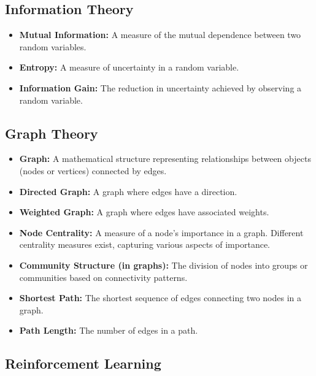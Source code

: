\documentclass[12pt, a4paper]{article}
\begin{document}
\subsection{Information Theory}

\begin{itemize}
    \item \textbf{Mutual Information:}  A measure of the mutual dependence between two random variables.
    \item \textbf{Entropy:} A measure of uncertainty in a random variable.
    \item \textbf{Information Gain:}  The reduction in uncertainty achieved by observing a random variable.
\end{itemize}


\subsection{Graph Theory}

\begin{itemize}
    \item \textbf{Graph:} A mathematical structure representing relationships between objects (nodes or vertices) connected by edges.
    \item \textbf{Directed Graph:} A graph where edges have a direction.
    \item \textbf{Weighted Graph:} A graph where edges have associated weights.
    \item \textbf{Node Centrality:}  A measure of a node's importance in a graph.  Different centrality measures exist, capturing various aspects of importance.
    \item \textbf{Community Structure (in graphs): } The division of nodes into groups or communities based on connectivity patterns.
    \item \textbf{Shortest Path:} The shortest sequence of edges connecting two nodes in a graph.
    \item \textbf{Path Length:} The number of edges in a path.
\end{itemize}


\subsection{Reinforcement Learning}
\end{document}
